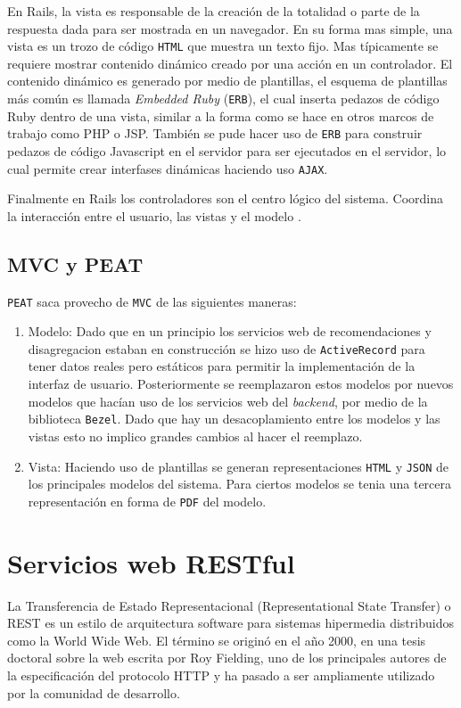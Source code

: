 En Rails, la vista es responsable de la creación de la totalidad o parte de la
respuesta dada para ser mostrada en un navegador. En su forma mas simple, una
vista es un trozo de código \texttt{HTML} que muestra un texto fijo. Mas típicamente
se requiere mostrar contenido dinámico creado por una acción en un controlador.
El contenido dinámico es generado por medio de plantillas, el esquema
de plantillas más común es llamada \textit{Embedded Ruby} (\texttt{ERB}),
el cual inserta pedazos de código Ruby dentro de una vista, similar a la forma
como se hace en otros marcos de trabajo como PHP o JSP. También se pude hacer uso de
\texttt{ERB} para construir pedazos de código Javascript en el servidor
para ser ejecutados en el servidor, lo cual permite crear interfases
dinámicas haciendo uso \texttt{AJAX}.

Finalmente en Rails los controladores son el centro lógico del sistema. Coordina
la interacción entre el usuario, las vistas y el modelo \cite[pag.~29]{15_agile_hansson}.

\subsection{MVC y PEAT}
\texttt{PEAT} saca provecho de \texttt{MVC} de las siguientes maneras:

\begin{enumerate}
\item Modelo: Dado que en un principio los servicios web de recomendaciones y
  disagregacion estaban en construcción se hizo uso de \texttt{ActiveRecord}
  para tener datos reales pero estáticos para permitir la implementación
  de la interfaz de usuario. Posteriormente se reemplazaron estos modelos
  por nuevos modelos que hacían uso de los servicios web del \textit{backend},
  por medio de la biblioteca \texttt{Bezel}. Dado que hay un desacoplamiento
  entre los modelos y las vistas esto no implico grandes cambios al hacer el
  reemplazo.
\item Vista: Haciendo uso de plantillas se generan representaciones \texttt{HTML}
  y \texttt{JSON} de los principales modelos del sistema. Para ciertos modelos se
  tenia una tercera representación en forma de \texttt{PDF} del modelo.
\end{enumerate}

\section{Servicios web RESTful}
La Transferencia de Estado Representacional (Representational State Transfer) o
REST es un estilo de arquitectura software para sistemas hipermedia distribuidos
como la World Wide Web. El término se originó en el año 2000, en una tesis doctoral
sobre la web escrita por Roy Fielding, uno de los principales autores de la
especificación del protocolo HTTP y ha pasado a ser ampliamente utilizado por
la comunidad de desarrollo.
